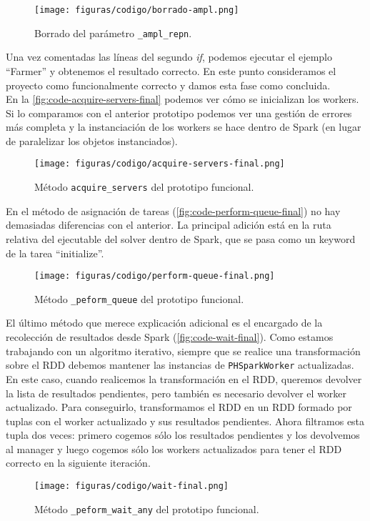\begin{figure}[H]
    \centerline{\texttt{[image: figuras/codigo/borrado-ampl.png]}}
    \caption{Borrado del parámetro \texttt{\_ampl\_repn}.}
    \label{fig:ampl-repn-deletion}
\end{figure}

Una vez comentadas las líneas del segundo \textit{if}, podemos ejecutar el ejemplo ``Farmer'' y obtenemos el resultado correcto. En este punto consideramos el proyecto como funcionalmente correcto y damos esta fase como concluida.\\

En la \autoref{fig:code-acquire-servers-final} podemos ver cómo se inicializan los workers. Si lo comparamos con el anterior prototipo podemos ver una gestión de errores más completa y la instanciación de los workers se hace dentro de Spark (en lugar de paralelizar los objetos instanciados).\\

\begin{figure}[H]
    \centerline{\texttt{[image: figuras/codigo/acquire-servers-final.png]}}
    \caption{Método \texttt{acquire\_servers} del prototipo funcional.}
    \label{fig:code-acquire-servers-final}
\end{figure}

En el método de asignación de tareas (\autoref{fig:code-perform-queue-final}) no hay demasiadas diferencias con el anterior. La principal adición está en la ruta relativa del ejecutable del solver dentro de Spark, que se pasa como un keyword de la tarea ``initialize''.\\

\begin{figure}[H]
    \centerline{\texttt{[image: figuras/codigo/perform-queue-final.png]}}
    \caption{Método \texttt{\_peform\_queue} del prototipo funcional.}
    \label{fig:code-perform-queue-final}
\end{figure}

El último método que merece explicación adicional es el encargado de la recolección de resultados desde Spark (\autoref{fig:code-wait-final}). Como estamos trabajando con un algoritmo iterativo, siempre que se realice una transformación sobre el RDD debemos mantener las instancias de \texttt{PHSparkWorker} actualizadas. En este caso, cuando realicemos la transformación en el RDD, queremos devolver la lista de resultados pendientes, pero también es necesario devolver el worker actualizado. Para conseguirlo, transformamos el RDD en un RDD formado por tuplas con el worker actualizado y sus resultados pendientes. Ahora filtramos esta tupla dos veces: primero cogemos sólo los resultados pendientes y los devolvemos al manager y luego cogemos sólo los workers actualizados para tener el RDD correcto en la siguiente iteración.

\begin{figure}[H]
    \centerline{\texttt{[image: figuras/codigo/wait-final.png]}}
    \caption{Método \texttt{\_peform\_wait\_any} del prototipo funcional.}
    \label{fig:code-wait-final}
\end{figure}